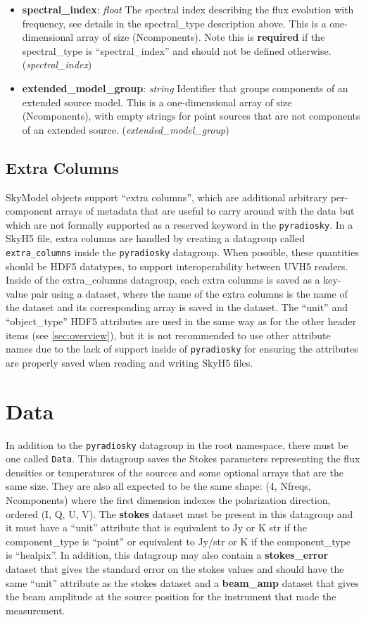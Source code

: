 \documentclass[11pt, oneside]{article}
\begin{document}
\begin{itemize}
\item \textbf{spectral\_index}: \textit{float}
The spectral index describing the flux evolution with frequency, see details in the spectral\_type description above.
This is a one-dimensional array of size (Ncomponents).
Note this is \textbf{required} if the spectral\_type is ``spectral\_index'' and should not be defined otherwise.
(\textit{spectral\_index})

\item \textbf{extended\_model\_group}: \textit{string}
Identifier that groups components of an extended source model.
This is a one-dimensional array of size (Ncomponents), with empty strings for point sources that are not components of an extended source.
(\textit{extended\_model\_group})
\end{itemize}

\subsection{Extra Columns}
\label{sec:extra-columns}
SkyModel objects support ``extra columns'', which are additional arbitrary per-component arrays of metadata that are useful to carry
around with the data but which are not formally supported as a reserved keyword in the \texttt{pyradiosky}. In a SkyH5 file,
extra columns are handled by creating a datagroup called \texttt{extra\_columns} inside the \texttt{pyradiosky} datagroup.
When possible, these quantities should be HDF5 datatypes, to support interoperability between UVH5 readers.
Inside of the extra\_columns datagroup, each extra columns is saved as a key-value pair using a dataset, where the name of the
extra columns is the name of the dataset and its corresponding array is saved in the dataset. The ``unit'' and ``object\_type'' HDF5 attributes
are used in the same way as for the other header items (see \ref{sec:overview}), but it is not recommended to use other attribute names
due to the lack of support inside of \texttt{pyradiosky} for ensuring the attributes are properly saved when reading and writing SkyH5 files.

\section{Data}
\label{sec:data}
In addition to the \texttt{pyradiosky} datagroup in the root namespace, there must be one called \texttt{Data}.
This datagroup saves the Stokes parameters representing the flux densities or temperatures of the sources and
some optional arrays that are the same size. They are also all expected to be the same shape: (4, Nfreqs, Ncomponents)
where the first dimension indexes the polarization direction, ordered (I, Q, U, V).
The \textbf{stokes} dataset must be present in this datagroup and it must have a ``unit'' attribute that is equivalent to Jy or K str if the
component\_type is ``point'' or equivalent to Jy/str or K if the component\_type is ``healpix''.
In addition, this datagroup may also contain a  \textbf{stokes\_error} dataset that gives the standard error on the stokes values and
should have the same ``unit'' attribute as the stokes dataset and a  \textbf{beam\_amp} dataset that gives the beam amplitude at the
source position for the instrument that made the measurement.
\end{document}
